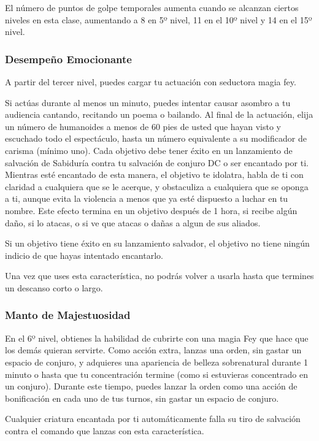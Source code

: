 \documentclass[a4paper,twocolumn,openany,10pt]{dndbook}
\begin{document}
El número de puntos de golpe temporales aumenta cuando se alcanzan ciertos niveles en esta clase, aumentando a 8 en 5º nivel, 11 en el 10º
nivel y 14 en el 15º nivel. 

\subsubsection{Desempeño Emocionante}
A partir del tercer nivel, puedes cargar tu actuación con seductora magia fey.

Si actúas durante al menos un minuto, puedes intentar causar asombro a tu audiencia cantando, recitando un poema o bailando. Al final de la
actuación, elija un número de humanoides a menos de 60 pies de usted que hayan visto y escuchado todo el espectáculo, hasta un número
equivalente a su modificador de carisma (mínimo uno). Cada objetivo debe tener éxito en un lanzamiento de salvación de Sabiduría contra tu
salvación de conjuro DC o ser encantado por ti. Mientras esté encantado de esta manera, el objetivo te idolatra, habla de ti con claridad a
cualquiera que se le acerque, y obstaculiza a cualquiera que se oponga a ti, aunque evita la violencia a menos que ya esté dispuesto a luchar
en tu nombre. Este efecto termina en un objetivo después de 1 hora, si recibe algún daño, si lo atacas, o si ve que atacas o dañas a algun
de sus aliados.

Si un objetivo tiene éxito en su lanzamiento salvador, el objetivo no tiene ningún indicio de que hayas intentado encantarlo.

Una vez que uses esta característica, no podrás volver a usarla hasta que termines un descanso corto o largo.

\subsubsection{Manto de Majestuosidad}
En el 6º nivel, obtienes la habilidad de cubrirte con una magia Fey que hace que los demás quieran servirte. Como acción extra, lanzas una
orden, sin gastar un espacio de conjuro, y adquieres una apariencia de belleza sobrenatural durante 1 minuto o hasta que tu concentración
termine (como si estuvieras concentrado en un conjuro). Durante este tiempo, puedes lanzar la orden como una acción de bonificación en cada
uno de tus turnos, sin gastar un espacio de conjuro.

Cualquier criatura encantada por ti automáticamente falla su tiro de salvación contra el comando que lanzas con esta característica.
\end{document}
